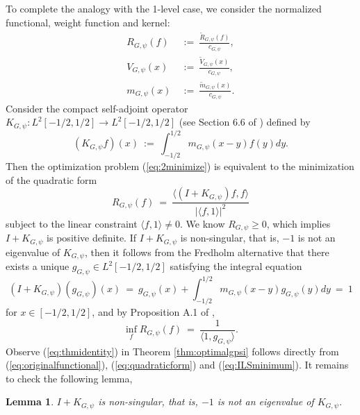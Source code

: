 \documentclass[12pt, reqno]{amsart}
\numberwithin{equation}{section}
\newtheorem{lemma}[theorem]{Lemma}
\theoremstyle{definition}
\theoremstyle{remark}
\begin{document}
To complete the analogy with the 1-level case, we consider the normalized functional, weight function and kernel:
	\begin{align}
		R_{G, \psi} (f) &\ := \  \frac{\tilde R_{G, \psi}(f)}{c_{G, \psi}}, \label{eq:quadraticform} \\
		V_{G, \psi} (x) &\ := \  \frac{\tilde V_{G, \psi} (x)}{c_{G, \psi}}, \\
		m_{G, \psi} (x) &\ := \  \frac{\tilde m_{G, \psi} (x)}{c_{G, \psi}}.
	\end{align}	
Consider the compact self-adjoint operator $K_{G, \psi} :L^2 [-1/2, 1/2] \to L^2 [-1/2, 1/2]$ (see Section 6.6 of \cite{RudnickSarnak}) defined by
	\begin{equation}
		(K_{G, \psi} f) (x) \ := \  \int_{-1/2}^{1/2} m_{G, \psi} (x - y) f(y) dy.
	\end{equation}	
Then the optimization problem (\ref{eq:2minimize}) is equivalent to the minimization of the quadratic form
    \begin{equation}
    		R_{G, \psi} (f) \ = \  \frac{\langle (I + K_{G, \psi})f, f \rangle}{|\langle f, 1 \rangle|^2}
    	\end{equation}	
subject to the linear constraint $\langle f, 1 \rangle \neq 0$. We know $R_{G, \psi} \geq 0$, which implies $I + K_{G, \psi}$ is positive definite. If $I + K_{G, \psi}$ is non-singular, that is, $-1$ is not an eigenvalue of $K_{G, \psi}$, then it follows from the Fredholm alternative that there exists a unique $g_{G, \psi} \in L^2 [-1/2, 1/2]$ satisfying the integral equation
	\begin{equation}
			(I + K_{G, \psi}) (g_{G, \psi}) (x) \ = \  g_{G, \psi} (x) + \int_{-1/2}^{1/2} m_{G, \psi} (x - y) g_{G, \psi} (y) dy \ = \  1 \label{eq:fredholm}
	\end{equation}	
for $x \in [-1/2, 1/2]$, and by Proposition A.1 of \cite{ILS},
	\begin{equation}
		\inf_f R_{G, \psi} (f) \ = \  \frac{1}{\langle 1, g_{G, \psi} \rangle}. \label{eq:ILSminimum}
	\end{equation}	
Observe (\ref{eq:thmidentity})	in Theorem \ref{thm:optimalgpsi} follows directly from (\ref{eq:originalfunctional}), (\ref{eq:quadraticform}) and (\ref{eq:ILSminimum}). It remains to check the following lemma,

\begin{lemma}
	$I + K_{G, \psi}$ is non-singular, that is, $-1$ is not an eigenvalue of $K_{G, \psi}$. \label{lem:nonsingular}
\end{lemma}
\end{document}
